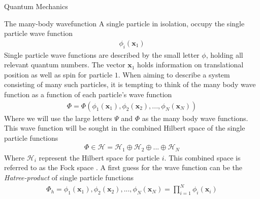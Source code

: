 \documentclass[twoside,english]{uiofysmaster}
\begin{document}
\begin{chapter}{Quantum Mechanics}
 	\begin{section}{The many-body wavefunction}
 		A single particle in isolation, occupy the single particle wave function \cite{Audun,Crawford}
 		\begin{align}
 			\phi_i(\mathbf{x}_1)
 		\end{align}
 		Single particle wave functions are described by the small letter $\phi$, holding all relevant quantum numbers. The vector $\mathbf{x}_1$ holds information on translational position as well as spin for particle $1$. When aiming to describe a system consisting of many such particles, it is tempting to think of the many body wave function as a function of each particle's wave function 
 		\begin{align}
 			\Phi = \Phi( \phi_1(\mathbf{x}_1), \phi_2(\mathbf{x}_2), ..., \phi_N(\mathbf{x}_N) )
 		\end{align}
 		Where we will use the large letters $\Psi$ and $\Phi$ as the many body wave functions. This wave function will be sought in the combined Hilbert space of the single particle functions \cite{MHJSlides}
 		\begin{align}
 			\Phi \in \mathcal{H} = \mathcal{H}_1 \oplus \mathcal{H}_2 \oplus ... \oplus \mathcal{H}_N
 		\end{align}
 		Where $\mathcal{H}_i$ represent the Hilbert space for particle $i$. This combined space is referred to as the Fock space \cite{MHJSlides}. A first guess for the wave function can be the \textit{Hatree-product} of single particle functions \cite{Audun,ShavittAndBartlett,Szabo} 
 		\begin{align}
 			\Phi_h = \phi_1(\mathbf{x}_1), \phi_2(\mathbf{x}_2), ..., \phi_N(\mathbf{x}_N) = \prod_{i=1}^N \phi_i(\mathbf{x}_i)
 		\end{align}

 	\end{section}


\end{chapter}
\end{document}
